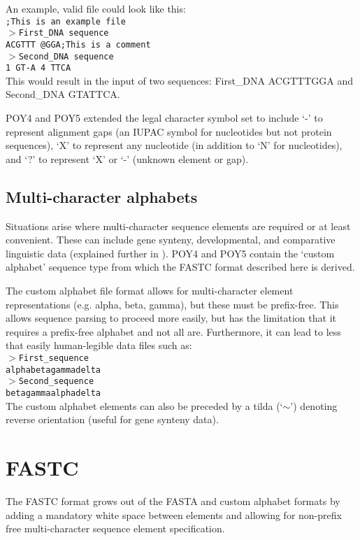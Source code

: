 \documentclass[12pt]{article}
\begin{document}
An example, valid file could look like this:\\
\texttt{;This is an example file}\\
\texttt{$>$First\_DNA sequence}\\
\texttt{ACGTTT @GGA;This is a comment}\\
\texttt{$>$Second\_DNA sequence}\\
\texttt{1 GT-A 4 TTCA }\\
This would result in the input of two sequences: First\_DNA  ACGTTTGGA and Second\_DNA GTATTCA.

POY4 \citep {POY4} and POY5 \citep {POY5, Wheeleretal2015} extended the legal character symbol set to include `-' to represent alignment gaps (an IUPAC symbol for nucleotides but not protein sequences), `X' to represent any nucleotide (in addition to `N' for nucleotides), and `?' to represent `X' or `-' (unknown element or gap).  

\subsection{Multi-character alphabets}
Situations arise where multi-character sequence elements are required or at least convenient.  These can include gene synteny, developmental, and comparative linguistic data (explained further in \citealp{SchulmeisterandWheeler2004,Wheeler2007, Wheeler2012, WheelerandWhiteley2015}).  POY4 and POY5 contain the `custom alphabet' sequence type from which the FASTC format described here is derived.

The custom alphabet file format allows for multi-character element representations (e.g. alpha, beta, gamma), but these must be prefix-free.  This allows sequence parsing to proceed more easily, but has the limitation that it requires a prefix-free alphabet and not all are.  Furthermore, it
can lead to less that easily human-legible data files such as:\\
\texttt{$>$First\_sequence}\\
\texttt{alphabetagammadelta}\\
\texttt{$>$Second\_sequence}\\
\texttt{betagammaalphadelta}\\
The custom alphabet elements can also be preceded by a tilda (`$\sim$') denoting reverse orientation (useful for gene synteny data).

\section{FASTC}
The FASTC format grows out of the FASTA and custom alphabet formats by adding a mandatory white space between elements and allowing for non-prefix free multi-character 
sequence element specification.
\pagebreak
\end{document}
